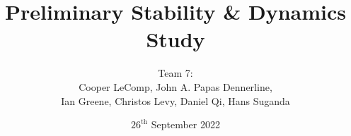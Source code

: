 \title{Preliminary Stability \& Dynamics Study}
\author{Team 7:
\\Cooper LeComp, John A. Papas Dennerline, 
\\Ian Greene, Christos Levy, Daniel Qi, Hans Suganda}
\date{$26^{\text{th}}$ September 2022}
